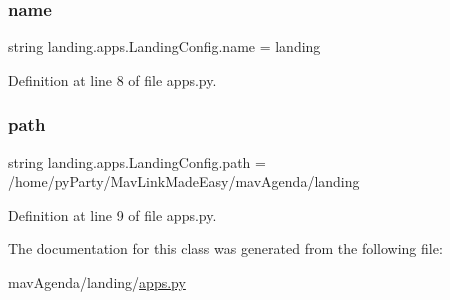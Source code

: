 \subsubsection{\texorpdfstring{name}{name}}
{\footnotesize\ttfamily string landing.\+apps.\+Landing\+Config.\+name = \textquotesingle{}landing\textquotesingle{}\hspace{0.3cm}{\ttfamily [static]}}



Definition at line 8 of file apps.\+py.

\mbox{\label{classlanding_1_1apps_1_1LandingConfig_a5e24228e720bc543458d2f18d457077c}} 
\subsubsection{\texorpdfstring{path}{path}}
{\footnotesize\ttfamily string landing.\+apps.\+Landing\+Config.\+path = \textquotesingle{}/home/py\+Party/Mav\+Link\+Made\+Easy/mav\+Agenda/landing\textquotesingle{}\hspace{0.3cm}{\ttfamily [static]}}



Definition at line 9 of file apps.\+py.



The documentation for this class was generated from the following file\+:\begin{DoxyCompactItemize}
\item 
mav\+Agenda/landing/\mbox{\hyperlink{apps_8py}{apps.\+py}}\end{DoxyCompactItemize}

